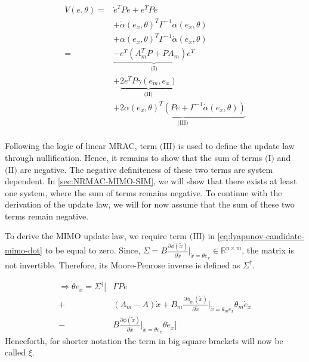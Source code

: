 \begin{equation}
    \begin{aligned}
        \dot V(e,\theta) = &  \dot e^T P e + e^T P \dot e \\
        & + \dot\alpha(e_x,\theta)^T\Gamma^{-1}\alpha(e_x,\theta)\\ 
        & + \alpha(e_x,\theta)^T\Gamma^{-1}\dot\alpha(e_x,\theta)\\
        = & \underbrace{-e^T(A_m^TP + PA_m)e^T}_{\textrm{(I)}} \\
        & + \underbrace{2e^TP\gamma(e_m,e_x)}_{\textrm{(II)}} \\
        & + \underbrace{2\alpha(e_x,\theta)^T(Pe+\Gamma^{-1}\dot\alpha(e_x,\theta))}_{\textrm{(III)}}\\
    \end{aligned}
    \label{eq:lyapunov-candidate-mimo-dot}
\end{equation}

Following the logic of linear MRAC, term $\textrm{(III)}$ is used to define the update law through nullification. Hence, it remains to show that the sum of terms $\textrm{(I)}$ and $\textrm{(II)}$ are negative. The negative definiteness of these two terms are system dependent. In \cref{sec:NRMAC-MIMO-SIM}, we will show that there exists at least one system, where the sum of terms remains negative. To continue with the derivation of the update law, we will for now assume that the sum of these two terms remain negative.

To derive the MIMO update law, we require term $\textrm{(III)}$ in \cref{eq:lyapunov-candidate-mimo-dot} to be equal to zero. Since, $\Sigma=B \frac{\partial \phi(\tilde x)}{\partial \tilde x}\vert_{\tilde x=\theta e_x}\in\mathbb{R}^{n\times m}$, the matrix is not invertible. Therefore, its Moore-Penrose inverse is defined as $\Sigma^{\dagger}$.

\begin{equation}
    \begin{aligned}
        \Rightarrow \dot\theta e_x = \Sigma^{\dagger}
        \biggl[ &\Gamma Pe \\
           + & (A_m-A)\dot x + B_m \frac{\partial \phi_m(\tilde x)}{\partial \tilde x}\vert_{\tilde x=\theta_m e_x}\theta_m \dot e_x \\
           - & B \frac{\partial \phi(\tilde x)}{\partial \tilde x}\vert_{\tilde x=\theta e_x}\theta \dot e_x \biggr]
    \end{aligned}
    \label{eq:moore-penrose2}
\end{equation}
Henceforth, for shorter notation the term in big square brackets will now be called $\xi$.

